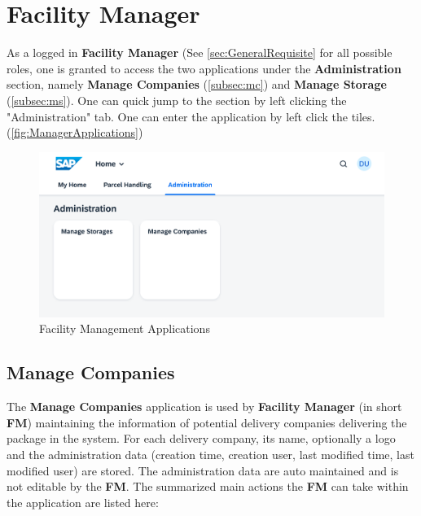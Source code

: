 \pagebreak

\section{Facility Manager}
\label{sec:UdocFacilityManager}

As a logged in \textbf{Facility Manager} (See \autoref{sec:GeneralRequisite} for all possible roles, one is granted to access the two applications under the \textbf{Administration} section, namely \textbf{Manage Companies} (\autoref{subsec:mc}) and \textbf{Manage Storage} (\autoref{subsec:ms}). One can quick jump to the section by left clicking the "Administration" tab. One can enter the application by left click the tiles. (\autoref{fig:ManagerApplications})

\begin{figure}[H]
	\centering
	\includegraphics[width=1\linewidth]{images/user_doc/overviews/AdminTab.png}
	\caption{Facility Management Applications}
	\label{fig:ManagerApplications}
\end{figure}


\subsection{Manage Companies}
\label{subsec:mc}

The \textbf{Manage Companies} application is used by \textbf{Facility Manager} (in short \textbf{FM}) maintaining the information of potential delivery companies delivering the package in the system. For each delivery company, its name, optionally a logo and the administration data (creation time, creation user, last modified time, last modified user) are stored. The administration data are auto maintained and is not editable by the \textbf{FM}. The summarized main actions the \textbf{FM} can take within the application are listed here:

